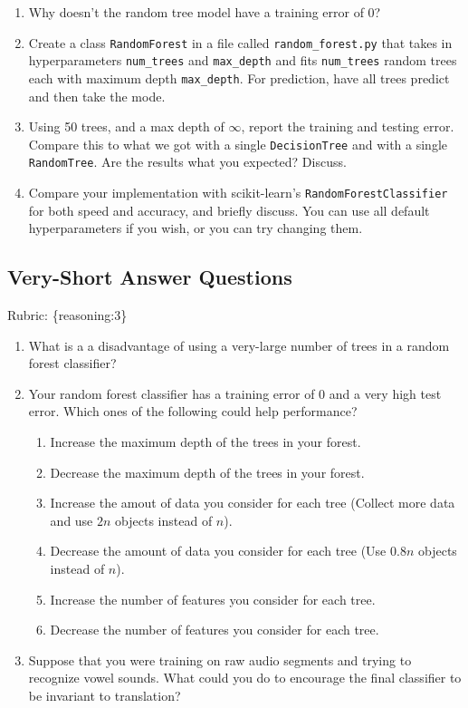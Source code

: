 \documentclass{article}
\def\blu#1{{\color{blu}#1}}
\def\gre#1{{\color{gre}#1}}
\def\enum#1{\begin{enumerate}#1\end{enumerate}}
\def\rubric#1{\gre{Rubric: \{#1\}}}{}
\begin{document}
\blu{
\enum{
\item Why doesn't the random tree model have a training error of 0?
\item Create a class \texttt{RandomForest} in a file called \texttt{random\string_forest.py} that takes in hyperparameters \texttt{num\string_trees} and \texttt{max\string_depth} and
fits \texttt{num\string_trees} random trees each with maximum depth \texttt{max\string_depth}. For prediction, have all trees predict and then take the mode.
\item Using 50 trees, and a max depth of $\infty$, report the training and testing error. Compare this to what we got with a single \texttt{DecisionTree} and with a single \texttt{RandomTree}. Are the results what you expected? Discuss.
\item Compare your implementation with scikit-learn's \texttt{RandomForestClassifier} for both speed and accuracy, and briefly discuss. You can use all default hyperparameters if you wish, or you can try changing them.
}
}

\subsection{Very-Short Answer Questions}
\rubric{reasoning:3}

\blu{\enum{
\item What is a a disadvantage of using a very-large number of trees in a random forest classifier?
\item Your random forest classifier has a training error of 0 and a very high test error. Which ones of the following could help performance?
\enum{
\item Increase the maximum depth of the trees in your forest.
\item Decrease the maximum depth of the trees in your forest.
\item Increase the amout of data you consider for each tree (Collect more data and use $2n$ objects instead of $n$).
\item Decrease the amount of data you consider for each tree (Use $0.8n$ objects instead of $n$).
\item Increase the number of features you consider for each tree.
\item Decrease the number of features you consider for each tree.
}
\item Suppose that you were training on raw audio segments and trying to recognize vowel sounds. What could you do to encourage the final classifier to be invariant to translation?
}
}
\end{document}

